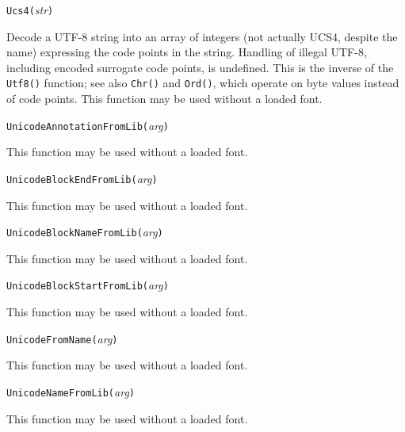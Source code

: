 \texttt{Ucs4(}\textit{str}\texttt{)}

Decode a UTF-8 string into an array of integers (not actually UCS4, despite
the name) expressing the code points
in the string.  Handling of illegal UTF-8, including encoded surrogate code
points, is undefined.  This is the inverse of the \texttt{Utf8()} function;
see also \texttt{Chr()} and \texttt{Ord()}, which operate on byte values
instead of code points.  This function may be used without a loaded font.



\texttt{UnicodeAnnotationFromLib(}\textit{arg}\texttt{)}

This function may be used without a loaded font.



\texttt{UnicodeBlockEndFromLib(}\textit{arg}\texttt{)}

This function may be used without a loaded font.



\texttt{UnicodeBlockNameFromLib(}\textit{arg}\texttt{)}

This function may be used without a loaded font.



\texttt{UnicodeBlockStartFromLib(}\textit{arg}\texttt{)}

This function may be used without a loaded font.



\texttt{UnicodeFromName(}\textit{arg}\texttt{)}

This function may be used without a loaded font.



\texttt{UnicodeNameFromLib(}\textit{arg}\texttt{)}

This function may be used without a loaded font.


